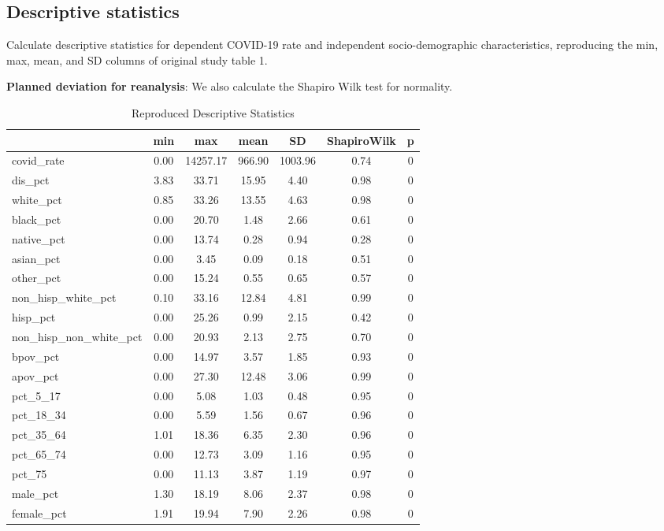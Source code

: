\documentclass[
]{article}
\begin{document}
\hypertarget{descriptive-statistics}{%
\subsection{Descriptive statistics}\label{descriptive-statistics}}

Calculate descriptive statistics for dependent COVID-19 rate and
independent socio-demographic characteristics, reproducing the min, max,
mean, and SD columns of original study table 1.

\textbf{Planned deviation for reanalysis}: We also calculate the Shapiro
Wilk test for normality.

\begin{table}

\caption{\label{tab:descriptive-statistics}Reproduced Descriptive Statistics}
\centering
\begin{tabular}[t]{l|>{}c|>{}c|>{}c|>{}c|>{}c|>{}c}
\hline
  & min & max & mean & SD & ShapiroWilk & p\\
\hline
covid\_rate & 0.00 & 14257.17 & 966.90 & 1003.96 & 0.74 & 0\\
\hline
dis\_pct & 3.83 & 33.71 & 15.95 & 4.40 & 0.98 & 0\\
\hline
white\_pct & 0.85 & 33.26 & 13.55 & 4.63 & 0.98 & 0\\
\hline
black\_pct & 0.00 & 20.70 & 1.48 & 2.66 & 0.61 & 0\\
\hline
native\_pct & 0.00 & 13.74 & 0.28 & 0.94 & 0.28 & 0\\
\hline
asian\_pct & 0.00 & 3.45 & 0.09 & 0.18 & 0.51 & 0\\
\hline
other\_pct & 0.00 & 15.24 & 0.55 & 0.65 & 0.57 & 0\\
\hline
non\_hisp\_white\_pct & 0.10 & 33.16 & 12.84 & 4.81 & 0.99 & 0\\
\hline
hisp\_pct & 0.00 & 25.26 & 0.99 & 2.15 & 0.42 & 0\\
\hline
non\_hisp\_non\_white\_pct & 0.00 & 20.93 & 2.13 & 2.75 & 0.70 & 0\\
\hline
bpov\_pct & 0.00 & 14.97 & 3.57 & 1.85 & 0.93 & 0\\
\hline
apov\_pct & 0.00 & 27.30 & 12.48 & 3.06 & 0.99 & 0\\
\hline
pct\_5\_17 & 0.00 & 5.08 & 1.03 & 0.48 & 0.95 & 0\\
\hline
pct\_18\_34 & 0.00 & 5.59 & 1.56 & 0.67 & 0.96 & 0\\
\hline
pct\_35\_64 & 1.01 & 18.36 & 6.35 & 2.30 & 0.96 & 0\\
\hline
pct\_65\_74 & 0.00 & 12.73 & 3.09 & 1.16 & 0.95 & 0\\
\hline
pct\_75 & 0.00 & 11.13 & 3.87 & 1.19 & 0.97 & 0\\
\hline
male\_pct & 1.30 & 18.19 & 8.06 & 2.37 & 0.98 & 0\\
\hline
female\_pct & 1.91 & 19.94 & 7.90 & 2.26 & 0.98 & 0\\
\hline
\end{tabular}
\end{table}
\end{document}

